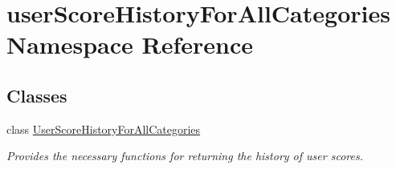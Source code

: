 \hypertarget{namespaceuserScoreHistoryForAllCategories}{\section{user\-Score\-History\-For\-All\-Categories Namespace Reference}
\label{namespaceuserScoreHistoryForAllCategories}
}
\subsection*{Classes}
\begin{DoxyCompactItemize}
\item 
class \hyperlink{classuserScoreHistoryForAllCategories_1_1UserScoreHistoryForAllCategories}{User\-Score\-History\-For\-All\-Categories}
\begin{DoxyCompactList}\small\item\em Provides the necessary functions for returning the history of user scores. \end{DoxyCompactList}\end{DoxyCompactItemize}
